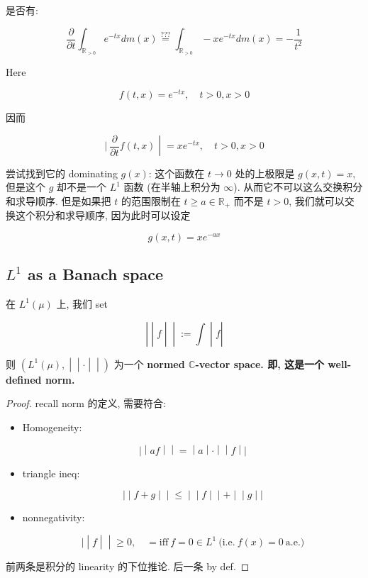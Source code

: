 \begin{example}

是否有:

\[\frac{\partial}{\partial t}\int_{\mathbb{R}_{> 0}}e^{- tx} dm(x)\overset{???}{=}\int_{\mathbb{R}_{> 0}} - xe^{- tx} dm(x) = - \frac{1}{t^{2}}\]

Here

\[f(t,x) = e^{- tx},\quad t > 0,x > 0\]

因而

\[\left. |\ \frac{\partial}{\partial t}f(t,x) \middle| = xe^{- tx},\quad t > 0,x > 0 \right.\]

尝试找到它的 dominating \(g(x)\): 这个函数在 \(t\rightarrow 0\) 处的上极限是 \(g(x,t) = x\), 但是这个 \(g\) 却不是一个 \(L^{1}\) 函数 (在半轴上积分为 \(\infty\)). 从而它不可以这么交换积分和求导顺序. 但是如果把 \(t\) 的范围限制在 \(t \geq a \in \mathbb{R}_{+}\) 而不是 \(t > 0\), 我们就可以交换这个积分和求导顺序, 因为此时可以设定

\[g(x,t) = xe^{- ax}\]

\end{example}

\subsection{\texorpdfstring{\(L^{1}\) as a Banach space}{L\^{}\{1\} as a Banach space}}\label{l1-as-a-banach-space}

\begin{theorem}{}

在 \(L^{1}(\mu)\) 上, 我们 set

\[\left. | \middle| f \middle| \middle| := \int \middle| f| \right.\]

则 \(\left. (L^{1}(\mu), \middle| \middle| \cdot \middle| \middle| ) \right.\) 为一个 \textbf{normed \(\mathbb{C}\)-vector space. 即, 这是一个 well-defined norm.}

\end{theorem}

\begin{proof}

recall norm 的定义, 需要符合:

\begin{itemize}
\item
  Homogeneity:

  \[\left. | \middle| af \middle| \middle| = \middle| a \middle| \cdot \middle| \middle| f \middle| | \right.\]
\item
  triangle ineq:

  \[\left. | \middle| f + g \middle| \middle| \leq \middle| \middle| f \middle| \middle| + \middle| \middle| g \middle| | \right.\]
\item
  nonnegativity:

  \[\left. | \middle| f \middle| \middle| \geq 0,\quad = \text{iff}\ f = 0 \in L^{1}\ \text{(i.e.}\ f(x) = 0\ \text{a.e.)} \right.\]
\end{itemize}

前两条是积分的 linearity 的下位推论. 后一条 by def.

\end{proof}

